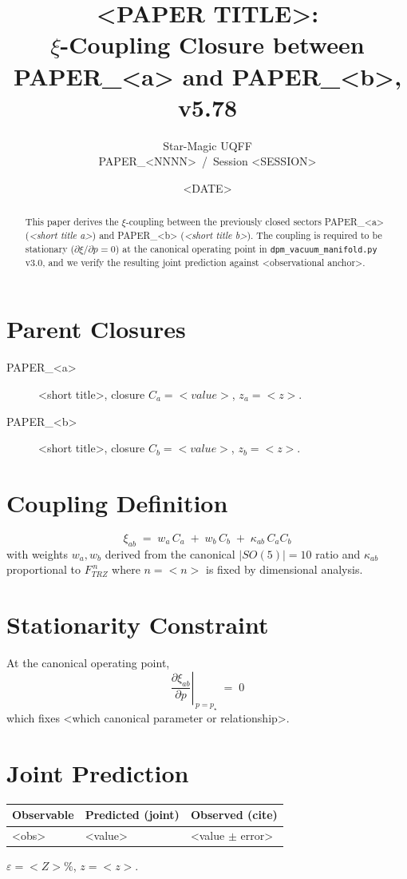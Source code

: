 \documentclass[11pt]{article}
\title{<PAPER TITLE>: \\ $\xi$-Coupling Closure between PAPER\_<a> and PAPER\_<b>, v5.78}
\author{Star-Magic UQFF \\ PAPER\_<NNNN> \,/\, Session <SESSION>}
\date{<DATE>}
\begin{document}
\maketitle

\begin{abstract}
This paper derives the $\xi$-coupling between the previously closed
sectors PAPER\_<a> (\emph{<short title a>}) and PAPER\_<b>
(\emph{<short title b>}). The coupling is required to be stationary
($\partial\xi/\partial p = 0$) at the canonical operating point in
\texttt{dpm\_vacuum\_manifold.py} v3.0, and we verify the resulting
joint prediction against <observational anchor>.
\end{abstract}

\section{Parent Closures}
\begin{description}
  \item[PAPER\_<a>] <short title>, closure $C_a = <value>$, $z_a=<z>$.
  \item[PAPER\_<b>] <short title>, closure $C_b = <value>$, $z_b=<z>$.
\end{description}

\section{Coupling Definition}
\begin{equation}
  \xi_{ab} \;=\; w_a\, C_a \;+\; w_b\, C_b \;+\; \kappa_{ab}\, C_a C_b
\end{equation}
with weights $w_a, w_b$ derived from the canonical $|SO(5)|=10$ ratio and
$\kappa_{ab}$ proportional to $F_{TRZ}^{\,n}$ where $n=<n>$ is fixed by
dimensional analysis.

\section{Stationarity Constraint}
At the canonical operating point,
\begin{equation}
  \left.\frac{\partial \xi_{ab}}{\partial p}\right|_{\,p=p_\star} \;=\; 0
\end{equation}
which fixes <which canonical parameter or relationship>.

\section{Joint Prediction}
\begin{longtable}{lll}
\toprule
Observable & Predicted (joint) & Observed (cite) \\
\midrule
<obs> & <value> & <value $\pm$ error> \\
\bottomrule
\end{longtable}
$\varepsilon = <Z>\%$, $z = <z>$.
\end{document}
